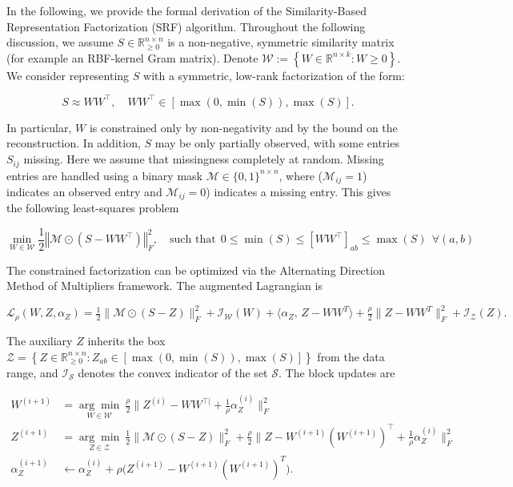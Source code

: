 \documentclass{article}
\begin{document}
\label{supp:math_derivation}


In the following, we provide the formal derivation of the Similarity-Based Representation Factorization (SRF) algorithm. Throughout the following discussion, we assume $S \in \mathbb{R}^{n \times n}_{\geq 0}$ is a non-negative, symmetric similarity matrix (for example an RBF-kernel Gram matrix). Denote $\mathcal{W} := \left\{ W \in \mathbb{R}^{n \times k} : W \geq 0 \right\}$. We consider representing $S$ with a symmetric, low-rank factorization of the form:

\begin{equation}
    S \approx WW^{\top}, \quad WW^{\top} \in [ \max(0, \min(S)), \max(S)].
\end{equation}

In particular, $W$ is constrained only by non-negativity and by the bound on the reconstruction. In addition, $S$ may be only partially observed, with some entries $S_{ij}$ missing. Here we assume that missingness completely at random. Missing entries are handled using a binary mask $\mathcal{M} \in \{ 0, 1\}^{n\times n}$, where ($\mathcal{M}_{ij} = 1$) indicates an observed entry and $\mathcal{M}_{ij} = 0$) indicates a missing entry. This gives the following least-squares problem

\begin{equation}
    \min_{W \in \mathcal{W}} \frac{1}{2} \left\Vert \mathcal{M} \odot \left(S - WW^{\top}  \right) \right\Vert^2_F, \quad \text{such that} \ \ 0 \leq \min(S) \leq [WW^{\top}]_{ab} \leq \max(S) \ \ \forall (a,b)
\end{equation}

The constrained factorization can be optimized via the Alternating Direction Method of Multipliers \citep[ADMM][]{Boyd2011} framework. The augmented Lagrangian is

\begin{equation}
    \mathcal{L}_{\rho}(W,Z,\alpha_Z) = \tfrac{1}{2}\|\mathcal{M}\odot( S - Z )\|_F^2
+ \mathcal{I}_{\mathcal{W}}(W)
+ \langle\alpha_Z,\,Z - W W^T\rangle
+ \tfrac{\rho}{2}\|Z - W W^T\|_F^2 + \mathcal{I}_{\mathcal{Z}}(Z).
\end{equation}

The auxiliary $Z$ inherits the box $\mathcal{Z} = \left\{ Z \in \mathbb{R}^{n \times n}_{\geq 0} : Z_{ab} \in [ \max(0, \min(S)), \max(S)] \right\}$ from the data range, and $\mathcal{I}_{\mathcal{S}}$ denotes the convex indicator of the set $\mathcal{S}$. The block updates are

\begin{align}
W^{(i+1)} &= \underset{W \in \mathcal{W}}{\arg\min}\
\frac{\rho}{2}\bigl\| Z^{(i)} - W W^{\top|} + \tfrac{1}{\rho}\alpha_Z^{(i)}\bigr\|_F^2 \label{eqt:sym_sub_W} \\
Z^{(i+1)} &= \underset{Z \in \mathcal{Z}}{\arg\min}\
\tfrac{1}{2}\|\mathcal{M}\odot(S-Z)\|_F^2
+ \tfrac{\rho}{2}\bigl\| Z - W^{(i+1)}(W^{(i+1)})^{\top} + \tfrac{1}{\rho}\alpha_Z^{(i)}\bigr\|_F^2 \label{eqt:sym_sub_Z} \\
\alpha_Z^{(i+1)} &\leftarrow \alpha_Z^{(i)} + \rho\bigl( Z^{(i+1)} - W^{(i+1)}(W^{(i+1)})^T\bigr). \nonumber
\end{align}
\end{document}
